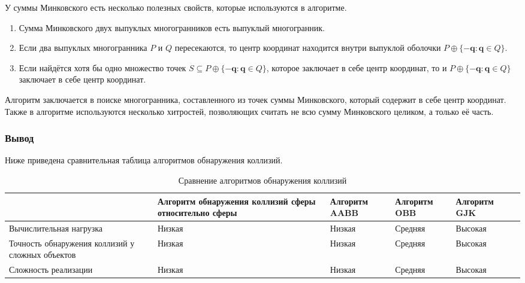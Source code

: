 У суммы Минковского есть несколько полезных свойств, которые используются в алгоритме.
\begin{enumerate}
    \item Сумма Минковского двух выпуклых многогранников есть выпуклый многогранник.
    \item Если два выпуклых многогранника $P$ и $Q$ пересекаются, то центр координат находится внутри выпуклой оболочки $P \oplus \{ -\boldsymbol{q} : \boldsymbol{q} \in Q \}$.
    \item Если найдётся хотя бы одно множество точек $S \subseteq P \oplus \{ -\boldsymbol{q} : \boldsymbol{q} \in Q \}$, которое заключает в себе центр координат, то и $P \oplus \{ -\boldsymbol{q} : \boldsymbol{q} \in Q \}$ заключает в себе центр координат.
\end{enumerate}

Алгоритм заключается в поиске многогранника, составленного из точек суммы Минковского, который содержит в себе центр координат.
Также в алгоритме используются несколько хитростей, позволяющих считать не всю сумму Минковского целиком, а только её часть.

\subsubsection*{Вывод}

Ниже приведена сравнительная таблица алгоритмов обнаружения коллизий.

\noindent
\begin{table}[H]
    \caption{Сравнение алгоритмов обнаружения коллизий}
    \label{tab:collisions}
\begin{adjustbox}{width=1\textwidth}
    \begin{tabular}{|p{}|p{}|p{}|p{}|p{}|p{}|}
        \hline
        &
        Алгоритм обнаружения коллизий сферы относительно сферы
        &
        Алгоритм AABB
        &
        Алгоритм OBB
        &
        Алгоритм GJK
        \\
        \hline
        Вычислительная нагрузка
        &
        Низкая
        &
        Низкая
        &
        Средняя
        &
        Высокая
        \\
        \hline
        Точность обнаружения коллизий у сложных объектов
        &
        Низкая
        &
        Низкая
        &
        Средняя
        &
        Высокая
        \\
        \hline
        Сложность реализации
        &
        Низкая
        &
        Низкая
        &
        Средняя
        &
        Высокая
        \\
        \hline
    \end{tabular}
\end{adjustbox}
\end{table}

